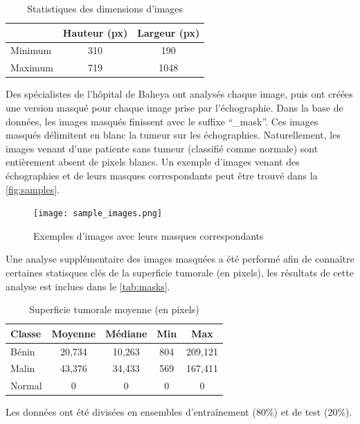 \documentclass[a4paper,12pt]{article}
\begin{document}
\begin{table}[h]
    \centering
    \caption{Statistiques des dimensions d'images}
    \begin{tabular}{lcc}
        \toprule
        & Hauteur (px) & Largeur (px) \\
        \midrule
        Minimum & 310 & 190 \\
        Maximum & 719 & 1048 \\
        \bottomrule
    \end{tabular}
    \label{tab:dimensions}
\end{table}

Des spécialistes de l'hôpital de Baheya ont analysés chaque image, puis ont créées une version masqué pour chaque image prise par l'échographie. Dans la base de données, les images masqués finissent avec le suffixe \enquote{\_mask}. Ces images masqués délimitent en blanc la tumeur sur les échographies. Naturellement, les images venant d'une patiente sans tumeur (classifié comme normale) sont entièrement absent de pixels blancs. Un exemple d'images venant des échographies et de leurs masques correspondants peut être trouvé dans la \autoref{fig:samples}.

\begin{figure}[h]
    \centering
    \texttt{[image: sample\_images.png]}
    \caption{Exemples d'images avec leurs masques correspondants}
    \label{fig:samples}
\end{figure}

Une analyse supplémentaire des images masquées a été performé afin de connaître certaines statisques clés de la superficie tumorale (en pixels), les résultats de cette analyse est inclues dans le \autoref{tab:masks}.

\begin{table}[h]
    \centering
    \caption{Superficie tumorale moyenne (en pixels)}
    \begin{tabular}{lcccc}
        \toprule
        Classe & Moyenne & Médiane & Min & Max \\
        \midrule
        Bénin & 20,734 & 10,263 & 804 & 209,121 \\
        Malin & 43,376 & 34,433 & 569 & 167,411 \\
        Normal & 0 & 0 & 0 & 0 \\
        \bottomrule
    \end{tabular}
    \label{tab:masks}
\end{table}

Les données ont été divisées en ensembles d'entraînement (80\%) et de test (20\%).
\end{document}
